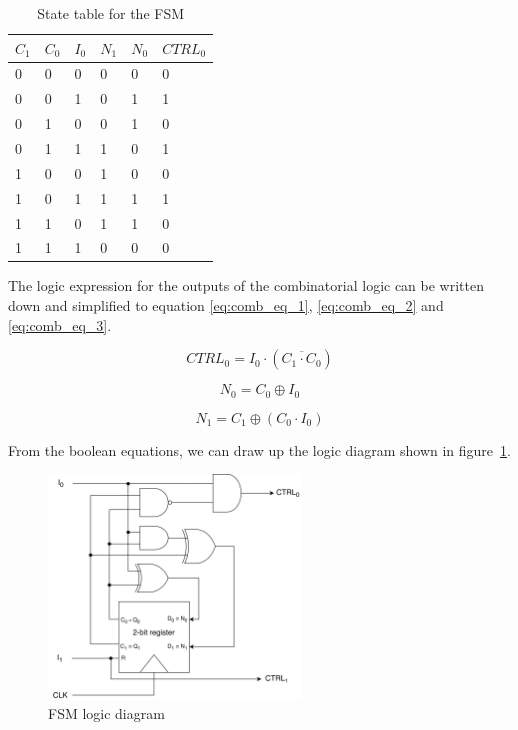 \begin{table}[H]
\caption{State table for the FSM}
\label{tab:state_table}
\centering
\begin{tabular}{|l|l|l|l|l|l|}
\hline
\rowcolor[HTML]{C0C0C0} 
$C_1$ & $C_0$ & $I_0$ & $N_1$ & $N_0$ & $CTRL_0$ \\
\hline
0  & 0  & 0  & 0   & 0   & 0 \\ 
\hline
0  & 0  & 1  & 0   & 1   & 1 \\ 
\hline
0  & 1  & 0  & 0   & 1   & 0 \\ 
\hline
0  & 1  & 1  & 1   & 0   & 1 \\ 
\hline
1  & 0  & 0  & 1   & 0   & 0 \\ 
\hline
1  & 0  & 1  & 1   & 1   & 1 \\ 
\hline
1  & 1  & 0  & 1   & 1   & 0 \\ 
\hline
1  & 1  & 1  & 0   & 0   & 0 \\ 
\hline

\end{tabular}
\end{table}

\noindent
The logic expression for the outputs of the combinatorial logic can be written down and simplified to equation \ref{eq:comb_eq_1}, \ref{eq:comb_eq_2} and \ref{eq:comb_eq_3}.

\begin{equation}
\label{eq:comb_eq_1}
    CTRL_0 = I_0\cdot(\overline{C_1 \cdot C_0})
\end{equation}

\begin{equation}
\label{eq:comb_eq_2}
    N_0 = C_0 \oplus I_0
\end{equation}

\begin{equation}
\label{eq:comb_eq_3}
    N_1 = C_1 \oplus (C_0 \cdot I_0)
\end{equation}

From the boolean equations, we can draw up the logic diagram shown in figure~\ref{fig:fsm_logic_diagram}.

\begin{figure}[H]
    \centering
    \includegraphics[width=0.6\textwidth]{Figures/logic diagram.png}
    \caption{FSM logic diagram}
    \label{fig:fsm_logic_diagram}
\end{figure}


